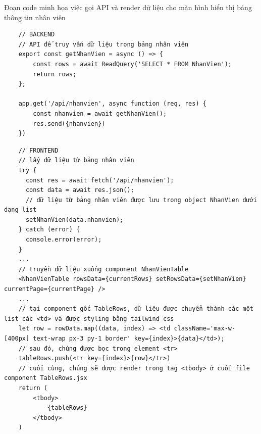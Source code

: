 \newpage
Đoạn code minh họa việc gọi API và render dữ liệu cho màn hình hiển thị bảng thông tin nhân viên
\begin{verbatim}
    // BACKEND
    // API để truy vấn dữ liệu trong bảng nhân viên
    export const getNhanVien = async () => {
        const rows = await ReadQuery('SELECT * FROM NhanVien');
        return rows;
    };

    app.get('/api/nhanvien', async function (req, res) {
        const nhanvien = await getNhanVien();
        res.send({nhanvien})
    })
\end{verbatim}
\begin{verbatim}
    // FRONTEND
    // lấy dữ liệu từ bảng nhân viên
    try {
      const res = await fetch('/api/nhanvien');
      const data = await res.json();
      // dữ liệu từ bảng nhân viên được lưu trong object NhanVien dưới dạng list
      setNhanVien(data.nhanvien); 
    } catch (error) {
      console.error(error);
    }
    ...
    // truyền dữ liệu xuống component NhanVienTable
    <NhanVienTable rowsData={currentRows} setRowsData={setNhanVien} currentPage={currentPage} />
    ...
    // tại component gốc TableRows, dữ liệu được chuyển thành các một list các <td> và được styling bằng tailwind css
    let row = rowData.map((data, index) => <td className='max-w-[400px] text-wrap px-3 py-1 border' key={index}>{data}</td>);
    // sau đó, chúng được bọc trong element <tr>
    tableRows.push(<tr key={index}>{row}</tr>)
    // cuối cùng, chúng sẽ được render trong tag <tbody> ở cuối file component TableRows.jsx
    return (
        <tbody>
            {tableRows}
        </tbody>
    )
\end{verbatim}

